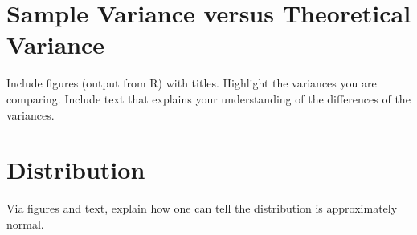 \documentclass[]{article}
\begin{document}
\section{Sample Variance versus Theoretical
Variance}\label{sample-variance-versus-theoretical-variance}

Include figures (output from R) with titles. Highlight the variances you
are comparing. Include text that explains your understanding of the
differences of the variances.

\section{Distribution}\label{distribution}

Via figures and text, explain how one can tell the distribution is
approximately normal.
\end{document}
